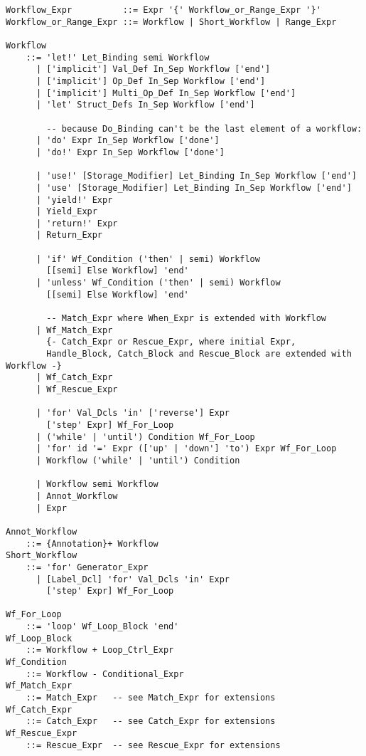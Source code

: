 \grammar\begin{lstlisting}[deletekeywords={is,with,or,is,and,where}]
Workflow_Expr          ::= Expr '{' Workflow_or_Range_Expr '}'
Workflow_or_Range_Expr ::= Workflow | Short_Workflow | Range_Expr

Workflow 
    ::= 'let!' Let_Binding semi Workflow
      | ['implicit'] Val_Def In_Sep Workflow ['end']
      | ['implicit'] Op_Def In_Sep Workflow ['end']
      | ['implicit'] Multi_Op_Def In_Sep Workflow ['end']
      | 'let' Struct_Defs In_Sep Workflow ['end']
           
        -- because Do_Binding can't be the last element of a workflow:
      | 'do' Expr In_Sep Workflow ['done']
      | 'do!' Expr In_Sep Workflow ['done']
           
      | 'use!' [Storage_Modifier] Let_Binding In_Sep Workflow ['end']
      | 'use' [Storage_Modifier] Let_Binding In_Sep Workflow ['end']
      | 'yield!' Expr
      | Yield_Expr
      | 'return!' Expr
      | Return_Expr
           
      | 'if' Wf_Condition ('then' | semi) Workflow
        [[semi] Else Workflow] 'end'
      | 'unless' Wf_Condition ('then' | semi) Workflow
        [[semi] Else Workflow] 'end'
         
        -- Match_Expr where When_Expr is extended with Workflow
      | Wf_Match_Expr
        {- Catch_Expr or Rescue_Expr, where initial Expr, 
        Handle_Block, Catch_Block and Rescue_Block are extended with Workflow -}
      | Wf_Catch_Expr
      | Wf_Rescue_Expr
           
      | 'for' Val_Dcls 'in' ['reverse'] Expr
        ['step' Expr] Wf_For_Loop
      | ('while' | 'until') Condition Wf_For_Loop
      | 'for' id '=' Expr (['up' | 'down'] 'to') Expr Wf_For_Loop
      | Workflow ('while' | 'until') Condition
           
      | Workflow semi Workflow
      | Annot_Workflow
      | Expr

Annot_Workflow 
    ::= {Annotation}+ Workflow           
Short_Workflow
    ::= 'for' Generator_Expr
      | [Label_Dcl] 'for' Val_Dcls 'in' Expr 
        ['step' Expr] Wf_For_Loop

Wf_For_Loop 
    ::= 'loop' Wf_Loop_Block 'end'
Wf_Loop_Block 
    ::= Workflow + Loop_Ctrl_Expr
Wf_Condition
    ::= Workflow - Conditional_Expr
Wf_Match_Expr
    ::= Match_Expr   -- see Match_Expr for extensions
Wf_Catch_Expr
    ::= Catch_Expr   -- see Catch_Expr for extensions
Wf_Rescue_Expr
    ::= Rescue_Expr  -- see Rescue_Expr for extensions
\end{lstlisting}

